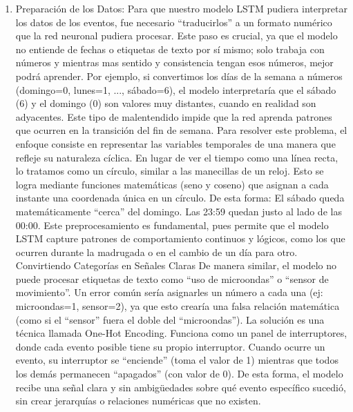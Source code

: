 \begin{enumerate}
            \begin{enumerate}
                  \item Preparación de los Datos:
                        Para que nuestro modelo LSTM pudiera interpretar los datos de los eventos, fue necesario ``traducirlos'' a un formato numérico que la red neuronal pudiera procesar. Este paso es crucial, ya que el modelo no entiende de fechas o etiquetas de texto por sí mismo; solo trabaja con números y mientras mas sentido y consistencia tengan esos números, mejor podrá aprender.
                        Por ejemplo, si convertimos los días de la semana a números (domingo=0, lunes=1, ..., sábado=6), el modelo interpretaría que el sábado (6) y el domingo (0) son valores muy distantes, cuando en realidad son adyacentes. Este tipo de malentendido impide que la red aprenda patrones que ocurren en la transición del fin de semana.
                        Para resolver este problema, el enfoque consiste en representar las variables temporales de una manera que refleje su naturaleza cíclica. En lugar de ver el tiempo como una línea recta, lo tratamos como un círculo, similar a las manecillas de un reloj. Esto se logra mediante funciones matemáticas (seno y coseno) que asignan a cada instante una coordenada única en un círculo. De esta forma:
                        El sábado queda matemáticamente ``cerca'' del domingo.
                        Las 23:59 quedan justo al lado de las 00:00.
                        Este preprocesamiento es fundamental, pues permite que el modelo LSTM capture patrones de comportamiento continuos y lógicos, como los que ocurren durante la madrugada o en el cambio de un día para otro.
                        Convirtiendo Categorías en Señales Claras
                        De manera similar, el modelo no puede procesar etiquetas de texto como ``uso de microondas'' o ``sensor de movimiento''. Un error común sería asignarles un número a cada una (ej: microondas=1, sensor=2), ya que esto crearía una falsa relación matemática (como si el ``sensor'' fuera el doble del ``microondas'').
                        La solución es una técnica llamada One-Hot Encoding. Funciona como un panel de interruptores, donde cada evento posible tiene su propio interruptor.
                        Cuando ocurre un evento, su interruptor se ``enciende'' (toma el valor de 1) mientras que todos los demás permanecen ``apagados'' (con valor de 0). De esta forma, el modelo recibe una señal clara y sin ambigüedades sobre qué evento específico sucedió, sin crear jerarquías o relaciones numéricas que no existen.

\end{enumerate}
\end{enumerate}
